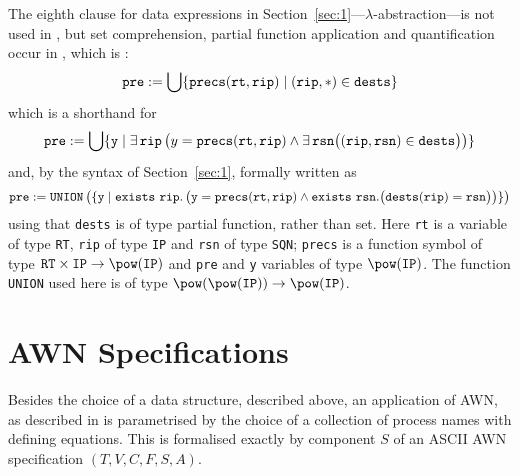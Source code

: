 \documentclass[adraft]{eptcs}
\newcommand{\sect}[1]{Section~\ref{sec:#1}}
\newcommand{\aac}[1]{{\tt #1}}    %
\begin{document}
The eighth clause for data expressions in \sect{1}---$\lambda$-abstraction---is not used in \cite{ESOP12,TR13},
but set comprehension, partial function application and quantification occur
in \cite[Process 1, Line 20]{ESOP12}, which is \cite[Process 5, Line 19]{TR13}:
\[\aac{pre}:=\bigcup\{\aac{precs}(\aac{rt},\aac{rip}) \mid (\aac{rip},*)\in\aac{dests}\}\]
which is a shorthand for
\[\aac{pre}:=\bigcup\{\aac{y} \mid \exists\,\aac{rip}\left(y=\aac{precs}(\aac{rt},\aac{rip})
  \wedge \exists\,\aac{rsn}\big((\aac{rip},\aac{rsn})\in\aac{dests}\big)\right)\}\]
and, by the syntax of \sect{1}, formally written as
\[\aac{pre}:=\aac{UNION}\left(\{\aac{y} \mid {\tt exists}~\aac{rip} . \left(\aac{y}=\aac{precs}(\aac{rt},\aac{rip})
  \wedge {\tt exists}~\aac{rsn} . \big(\aac{dests}(\aac{rip})=\aac{rsn}\big)\right)\}\right)\]
using that \aac{dests} is of type partial function, rather than set.
Here \aac{rt} is a variable of type \aac{RT}, \aac{rip} of type \aac{IP} and \aac{rsn} of type
\aac{SQN}; \aac{precs} is a function symbol of type $\aac{RT} \times \aac{IP} \rightarrow \pow(\aac{IP})$
and \aac{pre} and \aac{y} variables of type $\pow(\aac{IP})$. The function \aac{UNION} used here is
of type $\pow(\pow(\aac{IP})) \rightarrow \pow(\aac{IP})$.

\section{AWN Specifications}

Besides the choice of a data structure, described above, an application of AWN, as described in
\cite{ESOP12,TR13} is parametrised by the choice of a collection of process names with defining
equations. This is formalised exactly by component $S$ of an ASCII AWN specification  $(T,V,C,F,S,A)$.



\end{document}
